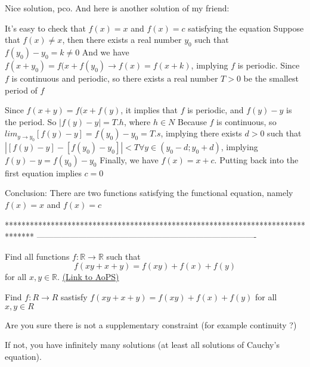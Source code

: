 \begin{solution}
	Nice solution, pco. And here is another solution of my friend:

It's easy to check that $ f(x) = x$ and $ f(x) = c$ satisfying the equation
Suppose that $ f(x) \neq x$, then there exists a real number $ y_0$ such that $ f(y_0) - y_0 = k \neq 0$
And we have
$ f(x + y_0) = f(x + f(y_0) \rightarrow f(x) = f(x + k)$, implying $ f$ is periodic.
Since $ f$ is continuous and periodic, so there exists a real number $ T > 0$ be the smallest period of $ f$

Since $ f(x + y) = f(x + f(y)$, it implies that $ f$ is periodic, and $ f(y) - y$ is the period. So $ |f(y) - y| = T.h$, where $ h \in N$
Because $ f$ is continuous, so $ lim_{y \rightarrow y_0} [f(y) - y] = f(y_0) - y_0 = T.s$, implying there exists $ d > 0$ such that
$ |[f(y) - y] - [f(y_0) - y_0]| < T \forall y \in (y_0 - d; y_0 + d)$, implying $ f(y) - y = f(y_0) - y_0$
Finally, we have $ f(x) = x + c$. Putting back into the first equation implies $ c = 0$

Conclusion:
There are two functions satisfying the functional equation, namely $ f(x) = x$ and $ f(x) = c$
\end{solution}
*******************************************************************************
-------------------------------------------------------------------------------

\begin{problem}
	Find all functions $f: \mathbb R \to \mathbb R$ such that
\[f(xy+x+y)=f(xy)+f(x)+f(y)\] for all $ x,y \in \mathbb R$.
	\flushright \href{https://artofproblemsolving.com/community/c6h314645}{(Link to AoPS)}
\end{problem}



\begin{solution}
	\begin{tcolorbox}Find $ f: R \to R$ sastisfy
$ f(xy + x + y) = f(xy) + f(x) + f(y)$ for all $ x,y \in R$\end{tcolorbox}

Are you sure there is not a supplementary constraint (for example continuity ?)

If not, you have infinitely many solutions (at least all solutions of Cauchy's equation).
\end{solution}



